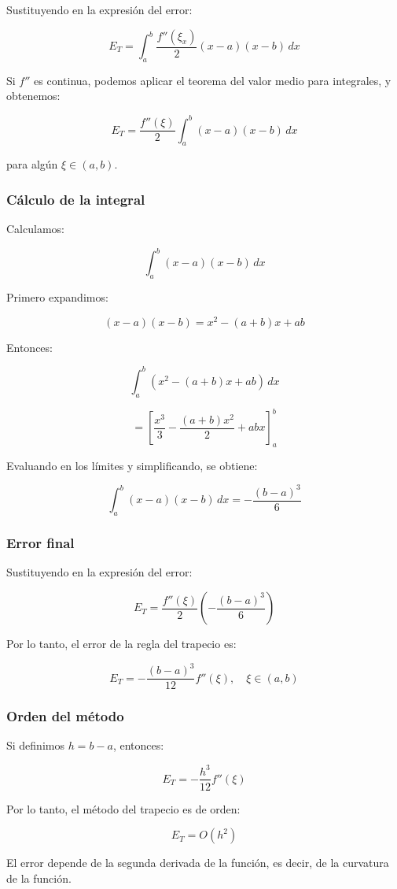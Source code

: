 \documentclass[12pt,a4paper]{article}
\begin{document}
Sustituyendo en la expresión del error:

\[
E_T = \int_a^b \frac{f''(\xi_x)}{2}(x-a)(x-b)\,dx
\]

Si $f''$ es continua, podemos aplicar el teorema del valor medio para integrales, 
y obtenemos:

\[
E_T = \frac{f''(\xi)}{2} \int_a^b (x-a)(x-b)\,dx
\]

para algún $\xi \in (a,b)$.

\subsubsection*{Cálculo de la integral}

Calculamos:

\[
\int_a^b (x-a)(x-b)\,dx
\]

Primero expandimos:

\[
(x-a)(x-b) = x^2 - (a+b)x + ab
\]

Entonces:

\[
\int_a^b (x^2 - (a+b)x + ab)\,dx
\]

\[
= \left[ \frac{x^3}{3} - \frac{(a+b)x^2}{2} + abx \right]_a^b
\]

Evaluando en los límites y simplificando, se obtiene:

\[
\int_a^b (x-a)(x-b)\,dx = -\frac{(b-a)^3}{6}
\]

\subsubsection*{Error final}

Sustituyendo en la expresión del error:

\[
E_T = \frac{f''(\xi)}{2} \left(-\frac{(b-a)^3}{6}\right)
\]

Por lo tanto, el error de la regla del trapecio es:

\[
E_T = -\frac{(b-a)^3}{12} f''(\xi), \quad \xi \in (a,b)
\]

\subsubsection*{Orden del método}

Si definimos $h = b-a$, entonces:

\[
E_T = -\frac{h^3}{12} f''(\xi)
\]

Por lo tanto, el método del trapecio es de orden:

\[
E_T = O(h^2)
\]

El error depende de la segunda derivada de la función, es decir, de la curvatura de la función.
\end{document}
